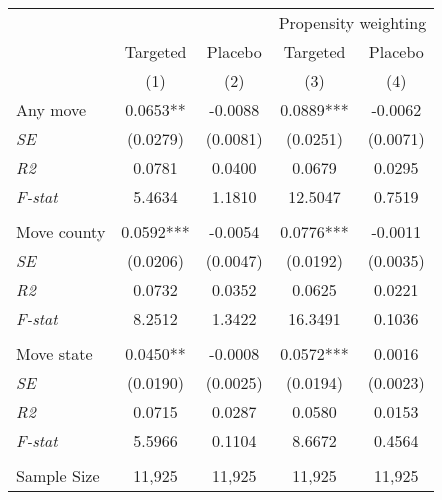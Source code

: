 \begin{tabular}{lcccc}
\toprule
\toprule
 & & & \multicolumn{2}{c}{Propensity weighting}  \\
 & Targeted & Placebo & Targeted & Placebo \\
 & (1) & (2)  & (3) & (4)  \\
\midrule 
 Any move & 0.0653** & -0.0088 & 0.0889*** & -0.0062 \\
 \textit{SE} & (0.0279) & (0.0081) & (0.0251) & (0.0071) \\
 \textit{R2} & 0.0781 & 0.0400 & 0.0679 & 0.0295  \\
 \textit{F-stat} & 5.4634 & 1.1810 & 12.5047 & 0.7519  \\
\\
 Move county & 0.0592*** & -0.0054 & 0.0776*** & -0.0011 \\
 \textit{SE} & (0.0206) & (0.0047) & (0.0192) & (0.0035) \\
 \textit{R2} & 0.0732 & 0.0352 & 0.0625 & 0.0221  \\
 \textit{F-stat} & 8.2512 & 1.3422 & 16.3491 & 0.1036  \\
\\
 Move state & 0.0450** & -0.0008 & 0.0572*** & 0.0016 \\
 \textit{SE} & (0.0190) & (0.0025) & (0.0194) & (0.0023) \\
 \textit{R2} & 0.0715 & 0.0287 & 0.0580 & 0.0153  \\
 \textit{F-stat} & 5.5966 & 0.1104 & 8.6672 & 0.4564  \\
\\
Sample Size  & 11,925  & 11,925  & 11,925  & 11,925 \\
\bottomrule
\bottomrule
\end{tabular}